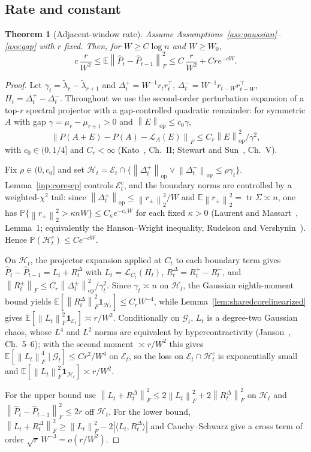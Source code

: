 \documentclass[11pt]{article}
\theoremstyle{tightplain}
\newtheorem{theorem}{Theorem}[section]
\theoremstyle{tightdef}
\DeclareMathOperator{\tr}{tr}
\DeclareMathOperator{\op}{op}
\newcommand{\E}{\mathbb E}
\newcommand{\Prob}{\mathbb P}
\newcommand{\norm}[1]{\left\lVert #1 \right\rVert}
\newcommand{\abs}[1]{\left\lvert #1 \right\rvert}
\newcommand{\one}{\mathbf 1}
\newcommand{\Phat}{\widehat P}
\newcommand{\Gcal}{\mathcal G}
\newcommand{\Ecal}{\mathcal E}
\newcommand{\Hcal}{\mathcal H}
\begin{document}
\subsection{Rate and constant}\label{sec:rate}

\begin{theorem}[Adjacent-window rate]\label{thm:conditionalbenchmark}
Assume Assumptions~\ref{ass:gaussian}--\ref{ass:gap} with $r$ fixed. Then, for
$W\ge C\log n$ and $W\ge W_0$,
\[
c\,\frac r{W^2}\le \E\norm{\Phat_t-\Phat_{t-1}}_F^2\le C\,\frac r{W^2}+Cr e^{-cW}.
\]
\end{theorem}

\begin{proof}
Let $\gamma_t=\widetilde\lambda_r-\widetilde\lambda_{r+1}$ and
$\Delta_t^+=W^{-1}r_t r_t^\top$, $\Delta_t^-=W^{-1}r_{t-W}r_{t-W}^\top$,
$H_t=\Delta_t^+-\Delta_t^-$. Throughout we use the second-order perturbation
expansion of a top-$r$ spectral projector with a gap-controlled quadratic remainder:
for symmetric $A$ with gap $\gamma=\mu_r-\mu_{r+1}>0$ and
$\norm E_{\op}\le c_0\gamma$,
\[
\norm{P(A+E)-P(A)-\mathcal L_A(E)}_F\le C_r\norm E_{\op}^2/\gamma^2,
\]
with $c_0\in(0,1/4]$ and $C_r<\infty$ (Kato~\cite{kato}, Ch.~II; Stewart and
Sun~\cite{stewartsun}, Ch.~V).

Fix $\rho\in(0,c_0]$ and set
$\Hcal_t=\Ecal_t\cap\{\norm{\Delta_t^+}_{\op}\vee\norm{\Delta_t^-}_{\op}\le\rho\gamma_t\}$.
Lemma~\ref{inp:coresep} controls $\Ecal_t^c$, and the boundary norms are controlled by
a weighted-$\chi^2$ tail: since $\norm{\Delta_t^\pm}_{\op}\le\norm{r_\pm}_2^2/W$ and
$\E\norm{r_\pm}_2^2=\tr\Sigma\asymp n$, one has
$\Prob\{\norm{r_\pm}_2^2>\kappa nW\}\le C_\kappa e^{-c_\kappa W}$ for each fixed
$\kappa>0$ (Laurent and Massart~\cite{laurentmassart}, Lemma~1; equivalently the
Hanson--Wright inequality, Rudelson and Vershynin~\cite{rudelsonvershynin}). Hence
$\Prob(\Hcal_t^c)\le Ce^{-cW}$.

On $\Hcal_t$, the projector expansion applied at $C_t$ to each boundary term gives
$\Phat_t-\Phat_{t-1}=L_t+R_t^\Delta$ with $L_t=\mathcal L_{C_t}(H_t)$,
$R_t^\Delta=R_t^+-R_t^-$, and $\norm{R_t^\pm}_F\le C_r\norm{\Delta_t^\pm}_{\op}^2/\gamma_t^2$.
Since $\gamma_t\asymp n$ on $\Hcal_t$, the Gaussian eighth-moment bound yields
$\E[\norm{R_t^\Delta}_F^2\one_{\Hcal_t}]\le C_r W^{-4}$, while
Lemma~\ref{lem:sharedcorelinearized} gives $\E[\norm{L_t}_F^2\one_{\Ecal_t}]\asymp r/W^2$.
Conditionally on $\Gcal_t$, $L_t$ is a degree-two Gaussian chaos, whose $L^4$ and
$L^2$ norms are equivalent by hypercontractivity (Janson~\cite{janson}, Ch.~5--6);
with the second moment $\asymp r/W^2$ this gives
$\E[\norm{L_t}_F^4\mid\Gcal_t]\le Cr^2/W^4$ on $\Ecal_t$, so the loss on
$\Ecal_t\cap\Hcal_t^c$ is exponentially small and $\E[\norm{L_t}_F^2\one_{\Hcal_t}]\asymp r/W^2$.

For the upper bound use
$\norm{L_t+R_t^\Delta}_F^2\le 2\norm{L_t}_F^2+2\norm{R_t^\Delta}_F^2$ on $\Hcal_t$ and
$\norm{\Phat_t-\Phat_{t-1}}_F^2\le 2r$ off $\Hcal_t$. For the lower bound,
$\norm{L_t+R_t^\Delta}_F^2\ge\norm{L_t}_F^2-2\abs{\langle L_t,R_t^\Delta\rangle}$ and
Cauchy--Schwarz give a cross term of order $\sqrt r\,W^{-3}=o(r/W^2)$.
\end{proof}
\end{document}
